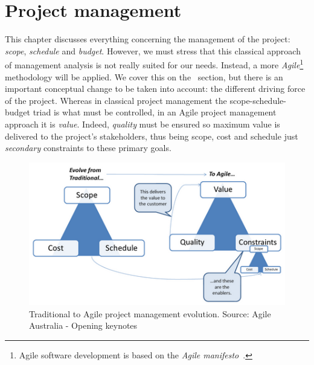 \chapter{Project management} %
\label{Chapter5ProjectManagement} %


This chapter discusses everything concerning the management of the project: \textit{scope}, \textit{schedule} and \textit{budget}. However, we must stress that this classical approach of management analysis is not really suited for our needs. Instead, a more \textit{Agile}\footnote{Agile software development is based on the \textit{Agile manifesto}~\cite{web:AgileManifesto}.} methodology will be applied. We cover this on the~ section, but there is an important conceptual change to be taken into account: the different driving force of the project. Whereas in classical project management the scope-schedule-budget triad is what must be controlled, in an Agile project management approach it is \textit{value}. Indeed, \textit{quality} must be ensured so maximum value is delivered to the project's stakeholders, thus being scope, cost and schedule just \textit{secondary} constraints to these primary goals.

\begin{figure}[ht]
	\centering
	\includegraphics[width=0.7\linewidth]{figures/agile-triangle.png}
	\caption[Transitioning to Agile methodologies.]{Traditional to Agile project management evolution. Source: Agile Australia - Opening keynotes~\citep{web:AgileTriangle}}
	\label{fig:agile-pm}
\end{figure}




